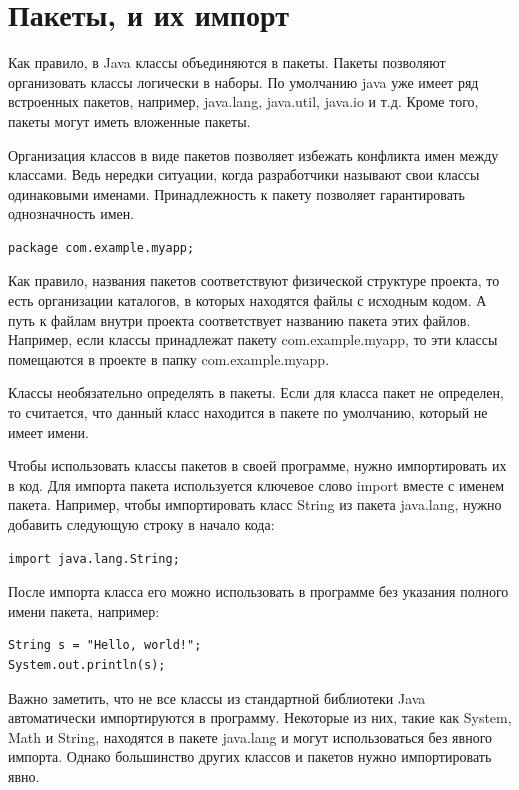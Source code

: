 \section{Пакеты, и их импорт}

Как правило, в Java классы объединяются в пакеты. Пакеты позволяют организовать классы логически в наборы. По умолчанию java уже имеет ряд встроенных пакетов, например, java.lang, java.util, java.io и т.д. Кроме того, пакеты могут иметь вложенные пакеты.

Организация классов в виде пакетов позволяет избежать конфликта имен между классами. Ведь нередки ситуации, когда разработчики называют свои классы одинаковыми именами. Принадлежность к пакету позволяет гарантировать однозначность имен.

\begin{lstlisting}
package com.example.myapp;
\end{lstlisting}

Как правило, названия пакетов соответствуют физической структуре проекта, то есть организации каталогов, в которых находятся файлы с исходным кодом. А путь к файлам внутри проекта соответствует названию пакета этих файлов. Например, если классы принадлежат пакету com.example.myapp, то эти классы помещаются в проекте в папку com.example.myapp.

Классы необязательно определять в пакеты. Если для класса пакет не определен, то считается, что данный класс находится в пакете по умолчанию, который не имеет имени.

Чтобы использовать классы пакетов в своей программе, нужно импортировать их в код. Для импорта пакета используется ключевое слово import вместе с именем пакета. Например, чтобы импортировать класс String из пакета java.lang, нужно добавить следующую строку в начало кода:

\begin{lstlisting}
import java.lang.String;
\end{lstlisting}

После импорта класса его можно использовать в программе без указания полного имени пакета, например:

\begin{lstlisting}
String s = "Hello, world!";
System.out.println(s);
\end{lstlisting}

Важно заметить, что не все классы из стандартной библиотеки Java автоматически импортируются в программу. Некоторые из них, такие как System, Math и String, находятся в пакете java.lang и могут использоваться без явного импорта. Однако большинство других классов и пакетов нужно импортировать явно.

